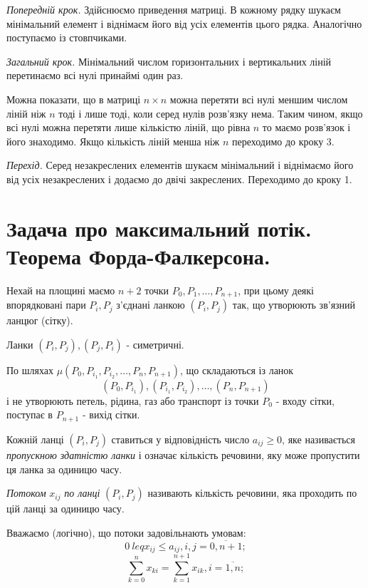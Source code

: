 \documentclass[12pt,a4paper]{report}
\newenvironment{slim_enumerate}{
\begin{enumerate}
  \setlength{\itemsep}{1pt}
  \setlength{\parskip}{0pt}
  \setlength{\parsep}{0pt}}
{\end{enumerate}}
\begin{document}
\begin{slim_enumerate}
  \item {\it Попередній крок.} Здійснюємо приведення матриці. В кожному рядку шукаєм мінімальний елемент і віднімаєм його від усіх елементів цього рядка. Аналогічно поступаємо із стовпчиками.
  \item {\it Загальний крок.} Мінімальний числом горизонтальних і вертикальних ліній перетинаємо всі нулі принаймі один раз.

Можна показати, що в матриці $n \times n$ можна перетяти всі нулі меншим числом ліній ніж $n$ тоді і лише тоді, коли серед нулів розв’язку нема. Таким чином, якщо всі нулі можна перетяти лише кількістю ліній, що рівна $n$ то маємо розв’язок і його знаходимо. Якщо кількість ліній менша ніж $n$ переходимо до кроку 3.

  \item {\it Перехід.} Серед незакреслених елементів шукаєм мінімальний і віднімаємо його від усіх незакреслених і додаємо до двічі закреслених. Переходимо до кроку 1.
\end{slim_enumerate}

\clearpage

\chapter{Задача про максимальний потік. Теорема Форда-Фалкерсона.}

Нехай на площині маємо $n+2$ точки $P_0, P_1, \dots, P_{n+1}$, при цьому деякі впорядковані пари $P_i, P_j$ з’єднані ланкою $(P_i, P_j)$ так, що утворюють зв’язний ланцюг (сітку).

Ланки $(P_i, P_j), (P_j, P_i)$ - симетричні.

По шляхах $\mu(P_0, P_{i_1}, P_{i_2}, \dots, P_n, P_{n+1})$, що складаються із ланок \[(P_0, P_{i_1}), (P_{i_1}, P_{i_2}), \dots, (P_n, P_{n+1})\] і не утворюють петель, рідина, газ або транспорт із точки $P_0$ - входу сітки, поступає в $P_{n+1}$ - вихід сітки.

Кожній ланці $(P_i, P_j)$ ставиться у відповідність число $a_{ij} \geq 0$, яке називається \emph{пропускною здатністю ланки} і означає кількість речовини, яку може пропустити ця ланка за одиницю часу.

\emph{Потоком} $x_{ij}$ \emph{по ланці} $(P_i, P_j)$ називають кількість речовини, яка проходить по цій ланці за одиницю часу.

Вважаємо (логічно), що потоки задовільнають умовам:
\begin{equation} 0 \ leq x_{ij} \leq a_{ij}, i,j = \overline{0, n+1}; \label{eq:flowvol} \end{equation}
\begin{equation} \sum_{k=0}^n x_{ki} = \sum_{k=1}^{n+1} x_{ik}, i = \overline{1, n}; \label{eq:flowbalance} \end{equation}
\end{document}
